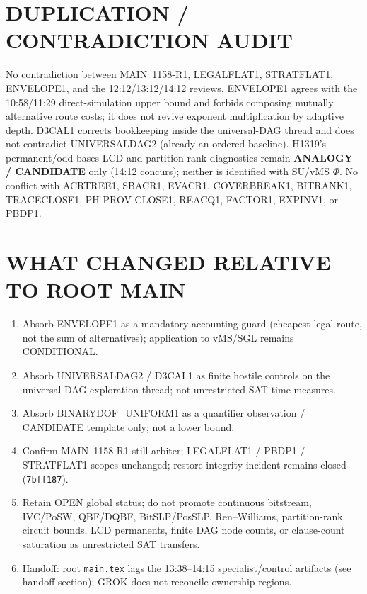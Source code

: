 \documentclass[11pt]{article}
\begin{document}
\section*{DUPLICATION / CONTRADICTION AUDIT}
No contradiction between MAIN~1158-R1, LEGALFLAT1, STRATFLAT1, ENVELOPE1, and the
12:12/13:12/14:12 reviews. ENVELOPE1 agrees with the 10:58/11:29 direct-simulation
upper bound and forbids composing mutually alternative route costs; it does not
revive exponent multiplication by adaptive depth. D3CAL1 corrects bookkeeping
inside the universal-DAG thread and does not contradict UNIVERSALDAG2 (already
an ordered baseline). H1319's permanent/odd-bases LCD and partition-rank
diagnostics remain \textbf{ANALOGY / CANDIDATE} only (14:12 concurs); neither is
identified with SU/vMS $\Phi$. No conflict with ACRTREE1, SBACR1, EVACR1,
COVERBREAK1, BITRANK1, TRACECLOSE1, PH-PROV-CLOSE1, REACQ1, FACTOR1, EXPINV1,
or PBDP1.

\section*{WHAT CHANGED RELATIVE TO ROOT MAIN}
\begin{enumerate}
\item Absorb ENVELOPE1 as a mandatory accounting guard (cheapest legal route,
not the sum of alternatives); application to vMS/SGL remains CONDITIONAL.
\item Absorb UNIVERSALDAG2 / D3CAL1 as finite hostile controls on the
universal-DAG exploration thread; not unrestricted SAT-time measures.
\item Absorb BINARYDOF\_UNIFORM1 as a quantifier observation / CANDIDATE template
only; not a lower bound.
\item Confirm MAIN~1158-R1 still arbiter; LEGALFLAT1 / PBDP1 / STRATFLAT1 scopes
unchanged; restore-integrity incident remains closed (\texttt{7bff187}).
\item Retain OPEN global status; do not promote continuous bitstream, IVC/PoSW,
QBF/DQBF, BitSLP/PosSLP, Ren--Williams, partition-rank circuit bounds, LCD
permanents, finite DAG node counts, or clause-count saturation as unrestricted
SAT transfers.
\item Handoff: root \texttt{main.tex} lags the 13:38--14:15 specialist/control
artifacts (see handoff section); GROK does not reconcile ownership regions.
\end{enumerate}
\end{document}
